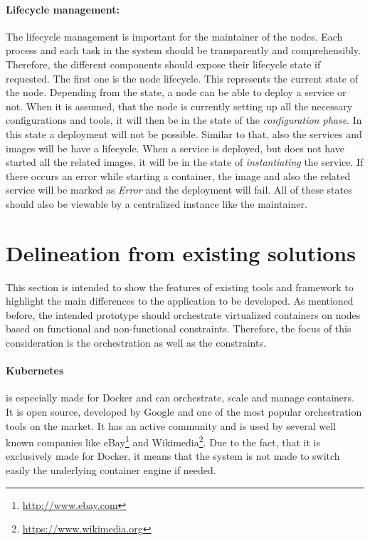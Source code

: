 \paragraph{Lifecycle management:}
The lifecycle management is important for the maintainer of the nodes.
Each process and each task in the system should be transparently and comprehensibly.
Therefore, the different components should expose their lifecycle state if requested.
The first one is the node lifecycle.
This represents the current state of the node.
Depending from the state, a node can be able to deploy a service or not.
When it is assumed, that the node is currently setting up all the necessary configurations and tools, it will then be in the state of the \textit{configuration phase}.
In this state a deployment will not be possible.
Similar to that, also the services and images will be have a lifecycle.
When a service is deployed, but does not have started all the related images, it will be in the state of \textit{instantiating} the service.
If there occurs an error while starting a container, the image and also the related service will be marked as \textit{Error} and the deployment will fail.
All of these states should also be viewable by a centralized instance like the maintainer.


\section{Delineation from existing solutions}
\label{section:delineation-from-existing-solutions}
This section is intended to show the features of existing tools and framework to highlight the main differences to the application to be developed.
As mentioned before, the intended prototype should orchestrate virtualized containers on nodes based on functional and non-functional constraints.
Therefore, the focus of this consideration is the orchestration as well as the constraints.

\paragraph{Kubernetes} is especially made for Docker and can orchestrate, scale and manage containers.
It is open source, developed by Google and one of the most popular orchestration tools on the market.
It has an active community and is used by several well known companies\autocite{Kubernetes:Case-Studies} like eBay\footnote{\url{http://www.ebay.com}} and Wikimedia\footnote{\url{https://www.wikimedia.org}}.
Due to the fact, that it is exclusively made for Docker, it means that the system is not made to switch easily the underlying container engine if needed.

